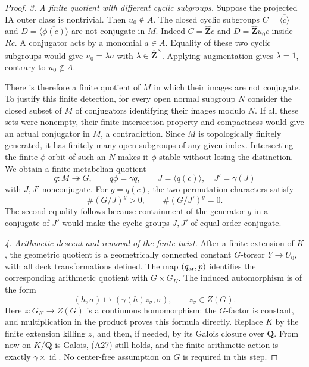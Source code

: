 \documentclass[11pt,oneside]{article}
\begin{document}
\begin{proof}
\emph{3. A finite quotient with different cyclic subgroups.}
Suppose the projected IA outer class is nontrivial.
Then $u_0\notin A$. The closed cyclic subgroups
$C=\overline{\langle c\rangle}$ and
$D=\overline{\langle\phi(c)\rangle}$ are not conjugate
in $M$. Indeed $C=\widehat{\mathbf Z}c$ and
$D=\widehat{\mathbf Z}u_0c$ inside $Rc$. A conjugator
acts by a monomial $a\in A$. Equality of these two
cyclic subgroups would give $u_0=\lambda a$ with
$\lambda\in\widehat{\mathbf Z}^{\times}$.
Applying augmentation gives $\lambda=1$, contrary to
$u_0\notin A$.

There is therefore a finite quotient of $M$ in which
their images are not conjugate. To justify this
finite detection, for every open normal subgroup $N$
consider the closed subset of $M$ of conjugators
identifying their images modulo $N$. If all these
sets were nonempty, their finite-intersection property
and compactness would give an actual conjugator in
$M$, a contradiction. Since $M$ is topologically
finitely generated, it has finitely many open subgroups
of any given index. Intersecting the finite $\phi$-orbit
of such an $N$ makes it $\phi$-stable without losing
the distinction. We obtain a finite metabelian quotient
\[
 q:M\twoheadrightarrow G,\qquad q\phi=\gamma q,
 \qquad J=\langle q(c)\rangle,
 \quad J'=\gamma(J)
\]
with $J,J'$ nonconjugate. For $g=q(c)$, the two
permutation characters satisfy
\[
                 \#(G/J)^g>0,\qquad \#(G/J')^g=0.           \tag{A28}
\]
The second equality follows because containment of the
generator $g$ in a conjugate of $J'$ would make the
cyclic groups $J,J'$ of equal order conjugate.

\emph{4. Arithmetic descent and removal of the finite twist.}
After a finite extension of $K$, the geometric quotient
is a geometrically connected constant $G$-torsor
$Y\to U_0$, with all deck transformations defined.
The map $(q_{\rm ar},p)$ identifies the corresponding
arithmetic quotient with $G\times G_K$.
The induced automorphism is of the form
\[
                 (h,\sigma)\longmapsto
                         (\gamma(h)z_\sigma,\sigma),
                 \qquad z_\sigma\in Z(G).
\]
Here $z:G_K\to Z(G)$ is a continuous homomorphism:
the $G$-factor is constant, and multiplication in the
product proves this formula directly. Replace $K$ by
the finite extension killing $z$, and then, if needed,
by its Galois closure over $\mathbf Q$. From now on
$K/\mathbf Q$ is Galois, (A27) still holds, and the
finite arithmetic action is exactly
$\gamma\times\operatorname{id}$. No center-free
assumption on $G$ is required in this step.


\end{proof}
\end{document}
